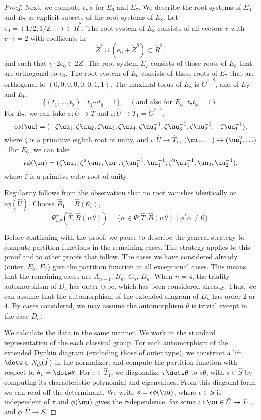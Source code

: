 \begin{proof}
Next, we compute $\epsilon,\phi$ for $E_6$ and $E_7$.  We describe the
root systems of $E_6$ and $E_7$ as explicit subsets of the root
systems of $E_8$.  Let $e_0=(1/2,1/2,\ldots)\in\ring{R}^8$.  The root
system of $E_8$ consists of all vectors $v$ with $v\cdot v = 2$ with
coefficents in
\[
\ring{Z}^8 \cup (e_0 + \ring{Z}^8) \subset \ring{R}^8,
\]
and such that $v\cdot 2 e_0 \in2\ring{Z}$.  The root system $E_7$
consists of those roots of $E_8$ that are orthogonal to $e_0$.  The
root system of $E_6$ consists of those roots of $E_7$ that are
orthogonal to $(0,0,0,0,0,0,1,1)$.  The maximal torus of $E_8$ is
$\ring{C}^{\times,8}$, and of $E_7$ and $E_6$:
\[
\{(t_1,\ldots,t_8)\mid t_1\cdots t_8 = 1\},\quad 
(\text{and also for $E_6$: } t_7 t_8 = 1).
\]
For $E_7$, we can take $\phi:\hat U\to\hat T$ and $\iota:\hat U\to\hat
T_1 = \ring{C}^{\times,4}$.
\[
\epsilon\phi(\uu) = (-\zeta\uu_1,\zeta\uu_2,\zeta\uu_3,\zeta\uu_4,
\zeta\uu_4^{-1},\zeta\uu_3^{-1},\zeta\uu_2^{-1},-\zeta\uu_1^{-1}),
\]
where $\zeta$ is a primitive eighth root of unity, and $\iota:\hat
U\to\hat T_1$, $(\uu_1,\ldots)\mapsto (\uu_1^2,\ldots)$.  For $E_6$,
we can take
\[
\epsilon\phi(\uu) = (\zeta \uu_1,\zeta^2 \uu_1,\uu_1,\zeta\uu_1^{-1},\uu_1^{-1},
\zeta^2\uu_1^{-1},\uu_2,\uu_2^{-1}),
\]
where $\zeta$ is a primitve cube root of unity.

Regularity follows from the observation that no root vanishes identically on
$\epsilon\phi(\hat U)$.
Choose $\hat B_1 = \hat B(\theta_1)$, 
\[
\Psi_{w\theta}^+(\hat T,\hat B(w\theta)) = \{
\alpha\in \Psi(\hat T,\hat B(w\theta)\mid \phi^*\alpha\ne0\}.
\]


Before continuing with the proof, we pause to describe the general
strategy to compute partition functions in the remaining cases.  The
strategy applies to this proof and to other proofs that follow.  The
cases we have considered already (outer, $E_6$, $E_7$) give the
partition function in all exceptional cases.  This means that the
remaining cases are $A_{n-1}$, $B_n$, $C_n$, $D_n$.  When $n=4$, the
triality automorphism of $D_4$ has outer type, which has been
considered already.  Thus, we can assume that the automorphism of the
extended diagram of $D_n$ has order $2$ or $4$.  By cases considered,
we may assume the automorphism $\theta$ is trivial except in the case
$D_n$.

We calculate the data in the same manner.  We work in the standard
representation of the each classical group.  For each automorphism of
the extended Dynkin diagram (excluding those of outer type), we
construct a lift $\dotw \in N_{\hat G}(\hat T)$ in the normalizer, and
compute the partition function with respect to $\theta_1=\dotw
\theta$.  For $\tau\in \hat T_1$, we diagonalize $\tau\dotw\theta$ to
$s\theta$, with $s\in\hat S$ by computing its characteristic
polynomial and eigenvalues.  From this diagonal form, we can read off
the determinant.    We write $s = \epsilon
\phi(\uu)$, where $\epsilon \in \hat S$ is independent of $\tau$ and
$\phi(\uu)$ gives the $\tau$-dependence, for some $\iota:\uu\in\hat
U\to \hat T_1$, and $\phi:\hat U\to \hat S$.



\end{proof}
